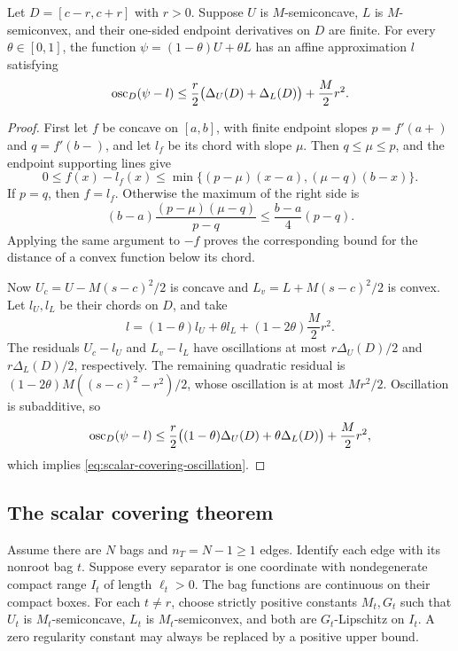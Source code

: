 \begin{lemma}
\label{lem:scalar-covering-chord}
Let $D=[c-r,c+r]$ with $r>0$.  Suppose $U$ is
$M$-semiconcave, $L$ is $M$-semiconvex, and their one-sided endpoint
derivatives on $D$ are finite.  For every $\theta\in[0,1]$, the function
$\psi=(1-\theta)U+\theta L$ has an affine approximation $l$ satisfying
\begin{equation}
 \operatorname{osc}_D(\psi-l)
 \leq\frac r2\bigl(\Delta_U(D)+\Delta_L(D)\bigr)
       +\frac M2r^2.
 \label{eq:scalar-covering-oscillation}
\end{equation}
\end{lemma}

\begin{proof}
First let $f$ be concave on $[a,b]$, with finite endpoint slopes
$p=f'(a+)$ and $q=f'(b-)$, and let $l_f$ be its chord with slope $\mu$.
Then $q\leq\mu\leq p$, and the endpoint supporting lines give
\[
 0\leq f(x)-l_f(x)
 \leq\min\{(p-\mu)(x-a),(\mu-q)(b-x)\}.
\]
If $p=q$, then $f=l_f$.  Otherwise the maximum of the right side is
\[
 (b-a)\frac{(p-\mu)(\mu-q)}{p-q}
 \leq\frac{b-a}{4}(p-q).
\]
Applying the same argument to $-f$ proves the corresponding bound for
the distance of a convex function below its chord.

Now $U_c=U-M(s-c)^2/2$ is concave and
$L_v=L+M(s-c)^2/2$ is convex.  Let $l_U,l_L$ be their chords on $D$,
and take
\[
 l=(1-\theta)l_U+\theta l_L
      +(1-2\theta)\frac M2r^2.
\]
The residuals $U_c-l_U$ and $L_v-l_L$ have oscillations at most
$r\Delta_U(D)/2$ and $r\Delta_L(D)/2$, respectively.
The remaining quadratic residual is
$(1-2\theta)M((s-c)^2-r^2)/2$, whose oscillation is at most $Mr^2/2$.
Oscillation is subadditive, so
\[
 \operatorname{osc}_D(\psi-l)
 \leq\frac r2\bigl((1-\theta)\Delta_U(D)
                      +\theta\Delta_L(D)\bigr)+\frac M2r^2,
\]
which implies \eqref{eq:scalar-covering-oscillation}.
\end{proof}

\subsection{The scalar covering theorem}

Assume there are $N$ bags and $n_T=N-1\geq1$ edges.  Identify each edge
with its nonroot bag $t$.  Suppose every separator is one coordinate
with nondegenerate compact range $I_t$ of length $\ell_t>0$.
The bag functions are continuous on their compact boxes.  For each
$t\ne r$, choose strictly positive constants $M_t,G_t$ such that $U_t$
is $M_t$-semiconcave, $L_t$ is $M_t$-semiconvex, and both are
$G_t$-Lipschitz on $I_t$.  A zero regularity constant may always be
replaced by a positive upper bound.

